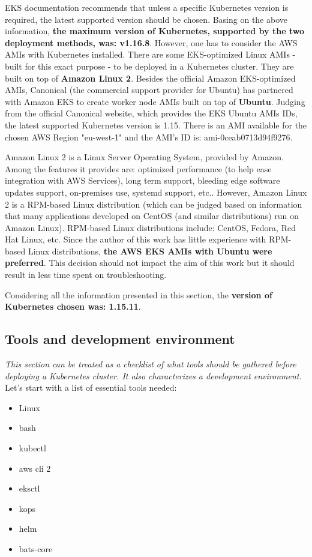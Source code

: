 EKS documentation recommends that unless a specific Kubernetes version is required, the latest supported version should be chosen\cite{online-eks-versions}. Basing on the above information, \textbf{the maximum version of Kubernetes, supported by the two deployment methods, was: v1.16.8}. However, one has to consider the AWS AMIs with Kubernetes installed. There are some EKS-optimized Linux AMIs - built for this exact purpose - to be deployed in a Kubernetes cluster. They are built on top of \textbf{Amazon Linux 2}\cite{eks-optimized-ami}. Besides the official Amazon EKS-optimized AMIs, Canonical (the commercial support provider for Ubuntu) has partnered with Amazon EKS to create worker node AMIs built on top of \textbf{Ubuntu}\cite{eks-ubu}. Judging from the official Canonical website, which provides the EKS Ubuntu AMIs IDs, the latest supported Kubernetes version is 1.15. There is an AMI available for the chosen AWS Region "eu-west-1" and the AMI's ID is: ami-0ceab0713d94f9276\cite{eks-ubu-ami-id}.

Amazon Linux 2 is a Linux Server Operating System, provided by Amazon. Among the features it provides are: optimized performance (to help ease integration with AWS Services), long term support, bleeding edge software updates support, on-premises use, systemd support, etc.\cite{al2}. However, Amazon Linux 2 is a RPM-based Linux distribution (which can be judged based on information that many applications developed on CentOS (and similar distributions) run on Amazon Linux)\cite{al2-centos}. RPM-based Linux distributions include: CentOS, Fedora, Red Hat Linux, etc. Since the author of this work has little experience with RPM-based Linux distributions, \textbf{the AWS EKS AMIs with Ubuntu were preferred}. This decision should not impact the aim of this work but it should result in less time spent on troubleshooting.

Considering all the information presented in this section, the \textbf{version of Kubernetes chosen was: 1.15.11}.



\subsection{Tools and development environment}
\label{tools}
\textit{This section can be treated as a checklist of what tools should be gathered before deploying a Kubernetes cluster. It also characterizes a development environment.}
\\

Let's start with a list of essential tools needed:
\begin{itemize}
\item Linux
\item bash
\item kubectl
\item aws cli 2
\item eksctl
\item kops
\item helm
\item bats-core
\end{itemize}

